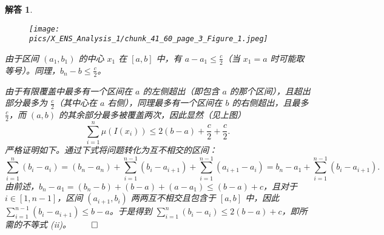 \documentclass[12pt,UTF8]{ctexbook}
\theoremstyle{exercisestyle}
\theoremstyle{solutionstyle}
\newtheorem*{solution*}{解答}
\newenvironment{solution}
  {\begin{solution*}}
  {\hfill\ensuremath{\qed}\end{solution*}}
\begin{document}
\begin{solution}
\vspace{8pt}
\begin{figure}[htbp]
  \centering
  \texttt{[image: pics/X\_ENS\_Analysis\_1/chunk\_41\_60\_page\_3\_Figure\_1.jpeg]}
\end{figure}

由于区间 \((a_1, b_1)\) 的中心 \(x_1\) 在 \([a, b]\) 中，有 \(a - a_1 \leqslant \frac{c}{2}\)（当 \(x_1 = a\) 时可能取等号）。同理，\(b_n - b \leqslant \frac{c}{2}\)。

由于有限覆盖中最多有一个区间在 \(a\) 的左侧超出（即包含 \(a\) 的那个区间），且超出部分最多为 \(\frac{c}{2}\)（其中心在 \(a\) 右侧），同理最多有一个区间在 \(b\) 的右侧超出，且最多 \(\frac{c}{2}\)，而 \((a,b)\) 的其余部分最多被覆盖两次，因此显然（见上图）
\[
\sum_{i=1}^{n} \mu(I(x_i)) \leqslant 2(b-a) + \frac{c}{2} + \frac{c}{2}.
\]
严格证明如下。通过下式将问题转化为互不相交的区间：
\[
\sum_{i=1}^{n} (b_i - a_i) = (b_n - a_n) + \sum_{i=1}^{n-1} (b_i - a_{i+1}) + \sum_{i=1}^{n-1} (a_{i+1} - a_i) = b_n - a_1 + \sum_{i=1}^{n-1} (b_i - a_{i+1}).
\]
由前述，\(b_n - a_1 = (b_n - b) + (b - a) + (a - a_1) \leqslant (b - a) + c\)，且对于 \(i \in [1, n-1]\)，区间 \((a_{i+1}, b_i)\) 两两互不相交且包含于 \([a, b]\) 中，因此 \(\sum_{i=1}^{n-1} (b_i - a_{i+1}) \leqslant b - a\)。于是得到 \(\sum_{i=1}^{n} (b_i - a_i) \leqslant 2(b - a) + c\)，即所需的不等式 (ii)。
\end{solution}
\end{document}
